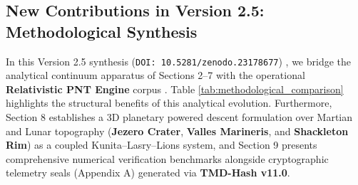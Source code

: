 \documentclass[11pt,a4paper,reqno]{article}
\theoremstyle{definition}
\theoremstyle{remark}
\begin{document}
\subsection{New Contributions in Version 2.5: Methodological Synthesis}

In this Version 2.5 synthesis (\texttt{DOI: 10.5281/zenodo.23178677}) \cite{ananda2026spde_v25}, we bridge the analytical continuum apparatus of Sections 2--7 with the operational \textbf{Relativistic PNT Engine} corpus \cite{ananda2026tmd_hash_v11, ananda2026modular_v75_synthesis, ananda2026automata_v70_monograph}. Table \ref{tab:methodological_comparison} highlights the structural benefits of this analytical evolution. Furthermore, Section 8 establishes a 3D planetary powered descent formulation over Martian and Lunar topography (\textbf{Jezero Crater}, \textbf{Valles Marineris}, and \textbf{Shackleton Rim}) as a coupled Kunita--Lasry--Lions system, and Section 9 presents comprehensive numerical verification benchmarks alongside cryptographic telemetry seals (Appendix A) generated via \textbf{TMD-Hash v11.0}.

\begin{table}[htbp]
\centering
\caption{Methodological Comparison: Standard vs. Version 2.5 Synthesis Framework.}
\label{tab:methodological_comparison}
\end{table}
\end{document}
